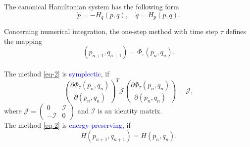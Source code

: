 \documentclass[10pt]{beamer}
\begin{document}
\begin{frame}
The canonical Hamiltonian system has the following form
\begin{equation}\label{eq-1}
\dot{p}=-H_q(p,q),\quad\dot{q}=H_p(p,q).
\end{equation}

Concerning numerical integration, the one-step method with time step $\tau$ defines the mapping
\begin{equation}\label{eq-2}
(p_{n+1},q_{n+1})=\Phi_\tau(p_n,q_n).
\end{equation}\\
\vspace{2mm}
The method \eqref{eq-2} is \textcolor{blue}{symplectic}, if
\begin{equation}\label{eq-3}
\left(\frac{\partial \Phi_\tau(p_n,q_n)}{\partial(p_n,q_n)}\right)^T\mathcal{J}\left(\frac{\partial \Phi_\tau(p_n,q_n)}{\partial(p_n,q_n)}\right)=\mathcal{J},
\end{equation}
where $\mathcal{J}=\left(\begin{array}{cc} 0 & \mathcal{I}\\ -\mathcal{I} & 0 \end{array}\right)$ and $\mathcal{I}$ is an identity matrix.\\
\vspace{2mm}
The method \eqref{eq-2} is \textcolor{blue}{energy-preserving}, if
\begin{equation}\label{eq-4}
H(p_{n+1},q_{n+1})=H(p_n,q_n).
\end{equation}
\end{frame}
\end{document}
